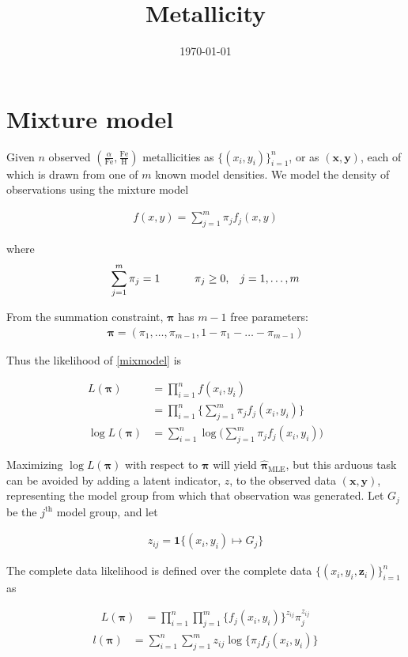 \documentclass[12pt]{amsart}
\title{Metallicity}
\author{\today}
\newcommand{\vect}[1]{\boldsymbol{\mathbf{#1}}}
\newcommand{\eqn}[1]{\begin{align*}
#1
\end{align*}}
\newcommand{\eqnl}[2]{\begin{align} \label{#1}
#2
\end{align}}
\newcommand{\shblock}{\hspace{3mm}}
\newcommand{\hblock}{\hspace{8mm}}
\newcommand{\eqnsep}{\shblock\hblock}
\newcommand{\bl}{\big\{}
\newcommand{\br}{\big\}}
\newcommand{\Bl}{\Big\{}
\newcommand{\Br}{\Big\}}
\newcommand{\indicator}{\mathbf{1}}
\newcommand{\vx}{\vect{x}}
\newcommand{\vy}{\vect{y}}
\newcommand{\vp}{\vect{\pi}}
\newcommand{\vpmle}{\hat{\vect{\pi}}_\text{MLE}}
\newcommand{\fab}{f_j}
\newcommand{\llp}{l(\vect{\pi})}
\newcommand{\sumn}{\sum^n_{i=1}}
\newcommand{\summ}{\sum^m_{j=1}}
\begin{document}
\maketitle






\section{Mixture model}

Given $n$ observed $(\frac{\alpha}{\text{Fe}}, \frac{\text{Fe}}{\text{H}})$ metallicities as $\bl (x_i,y_i) \br^n_{i=1}$, or as $(\vx,\vy)$, each of which is drawn from one of $m$ known model densities. We model the density of observations using the mixture model

\eqnl{mixmodel}{
	f(x,y) = \summ \pi_j \fab(x,y)
}

where \eqn{
	\summ \pi_j = 1 \eqnsep \pi_j \geq 0, \hspace{3mm} j=1,\ldots,m
 }

From the summation constraint, $\vp$ has $m-1$ free parameters: \eqn{
	\vp = (\pi_1, \ldots, \pi_{m-1}, 1-\pi_1-\ldots-\pi_{m-1})
}

Thus the likelihood of \eqref{mixmodel} is

\eqn{
	L(\vect{\pi}) &= \prod^n_{i=1} f(x_i,y_i)	 \\
	&= \prod^n_{i=1} \Bl  \summ \pi_j \fab(x_i,y_i)  \Br	\\
	\log L(\vect{\pi}) &= \sumn \log \Big( \summ \pi_j \fab(x_i,y_i)  \Big)
}

Maximizing $\log L(\vect{\pi})$ with respect to $\vp$ will yield $\vpmle$, but this arduous task can be avoided by adding a latent indicator, $z$, to the observed data $(\vx, \vy)$, representing the model group from which that observation was generated. Let $G_j$ be the $j^\text{th}$ model group, and let

\eqn{z_{ij} = \indicator \bl (x_i,y_i) \mapsto G_j \br}


The complete data likelihood is defined over the complete data $\bl (x_i,y_i,\vect{z}_i) \br^n_{i=1}$ as

\eqn{
	L(\vect{\pi}) &= \prod^n_{i=1} \prod^m_{j=1} \Bl \fab(x_i,y_i) \Br ^{z_{ij}} \pi_j^{z_{ij}}
}
\eqnl{loglike}{
	\llp &= \sumn \summ z_{ij}  \log \bl \pi_j  \fab(x_i,y_i) \br
}





\end{document}
